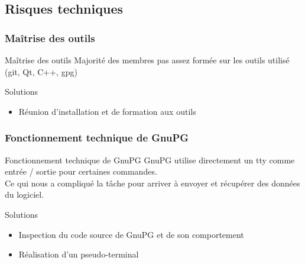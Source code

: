   \subsection{Risques techniques}
    \begin{frame}
      \frametitle{\color{white}Maîtrise des outils}
      \begin{block}{Maîtrise des outils}
        Majorité des membres pas assez formée sur les outils utilisé\\
        (git, Qt, C++, gpg)
      \end{block}
      \pause
      \begin{exampleblock}{Solutions}
        \begin{itemize}
          \item Réunion d'installation et de formation aux outils
        \end{itemize}
      \end{exampleblock}
    \end{frame}
    \begin{frame}
      \frametitle{\color{white}Fonctionnement technique de GnuPG}
      \begin{block}{Fonctionnement technique de GnuPG}
        GnuPG utilise directement un tty comme entrée / sortie pour certaines commandes.\\
        Ce qui nous a compliqué la tâche pour arriver à envoyer
        et récupérer des données du logiciel.
      \end{block}
      \pause
      \begin{exampleblock}{Solutions}
        \begin{itemize}
          \item Inspection du code source de GnuPG et de son comportement
          \item Réalisation d'un pseudo-terminal
        \end{itemize}
      \end{exampleblock}
    \end{frame}

